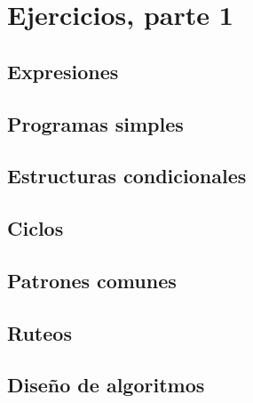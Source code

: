 \section{Ejercicios, parte 1}

\subsection{Expresiones}

\subsection{Programas simples}

\subsection{Estructuras condicionales}

\subsection{Ciclos}

\subsection{Patrones comunes}

\subsection{Ruteos}

\subsection{Diseño de algoritmos}
